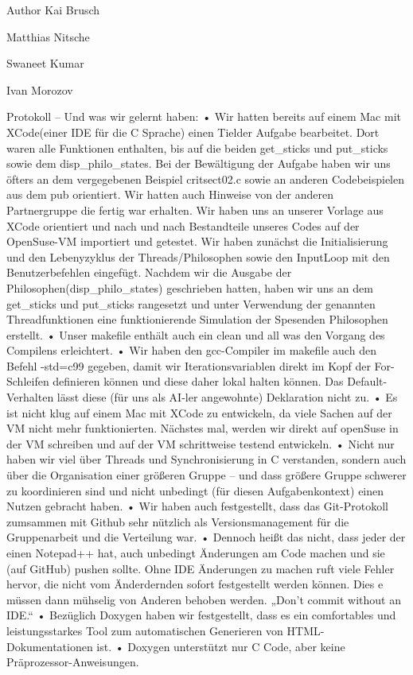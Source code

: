 \begin{DoxyAuthor}{Author}
Kai Brusch 

Matthias Nitsche 

Swaneet Kumar 

Ivan Morozov
\end{DoxyAuthor}
Protokoll – Und was wir gelernt haben\-: • Wir hatten bereits auf einem Mac mit X\-Code(einer I\-D\-E für die C Sprache) einen Tielder Aufgabe bearbeitet. Dort waren alle Funktionen enthalten, bis auf die beiden get\-\_\-sticks und put\-\_\-sticks sowie dem disp\-\_\-philo\-\_\-states. Bei der Bewältigung der Aufgabe haben wir uns öfters an dem vergegebenen Beispiel critsect02.\-c sowie an anderen Codebeispielen aus dem pub orientiert. Wir hatten auch Hinweise von der anderen Partnergruppe die fertig war erhalten. Wir haben uns an unserer Vorlage aus X\-Code orientiert und nach und nach Bestandteile unseres Codes auf der Open\-Suse-\/\-V\-M importiert und getestet. Wir haben zunächst die Initialisierung und den Lebenyzyklus der Threads/\-Philosophen sowie den Input\-Loop mit den Benutzerbefehlen eingefügt. Nachdem wir die Ausgabe der Philosophen(disp\-\_\-philo\-\_\-states) geschrieben hatten, haben wir uns an dem get\-\_\-sticks und put\-\_\-sticks rangesetzt und unter Verwendung der genannten Threadfunktionen eine funktionierende Simulation der Spesenden Philosophen erstellt. • Unser makefile enthält auch ein clean und all was den Vorgang des Compilens erleichtert. • Wir haben den gcc-\/\-Compiler im makefile auch den Befehl -\/std=c99 gegeben, damit wir Iterationsvariablen direkt im Kopf der For-\/\-Schleifen definieren können und diese daher lokal halten können. Das Default-\/\-Verhalten lässt diese (für uns als A\-I-\/ler angewohnte) Deklaration nicht zu. • Es ist nicht klug auf einem Mac mit X\-Code zu entwickeln, da viele Sachen auf der V\-M nicht mehr funktionierten. Nächstes mal, werden wir direkt auf open\-Suse in der V\-M schreiben und auf der V\-M schrittweise testend entwickeln. • Nicht nur haben wir viel über Threads und Synchronisierung in C verstanden, sondern auch über die Organisation einer größeren Gruppe – und dass größere Gruppe schwerer zu koordinieren sind und nicht unbedingt (für diesen Aufgabenkontext) einen Nutzen gebracht haben. • Wir haben auch festgestellt, dass das Git-\/\-Protokoll zumsammen mit Github sehr nützlich als Versionsmanagement für die Gruppenarbeit und die Verteilung war. • Dennoch heißt das nicht, dass jeder der einen Notepad++ hat, auch unbedingt Änderungen am Code machen und sie (auf Git\-Hub) pushen sollte. Ohne I\-D\-E Änderungen zu machen ruft viele Fehler hervor, die nicht vom Änderdernden sofort festgestellt werden können. Dies e müssen dann mühselig von Anderen behoben werden. „\-Don’t commit without an I\-D\-E.\-“ • Bezüglich Doxygen haben wir festgestellt, dass es ein comfortables und leistungsstarkes Tool zum automatischen Generieren von H\-T\-M\-L-\/\-Dokumentationen ist. • Doxygen unterstützt nur C Code, aber keine Präprozessor-\/\-Anweisungen. 
